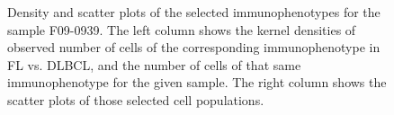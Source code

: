\begin{figure}[!ht]
{  }
  \caption{Density and scatter plots of the selected immunophenotypes for the sample F09-0939. The left column shows the kernel densities of observed number of cells of the corresponding immunophenotype in FL vs. DLBCL, and the number of cells of that same immunophenotype for the given sample. The right column shows the scatter plots of those selected cell populations.}
  \label{fig:fcs-qa-density-scatter-FL}
\end{figure}

